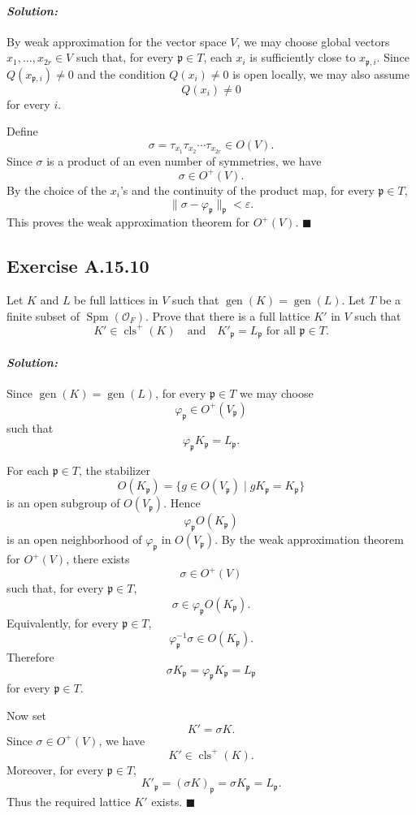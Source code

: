 \documentclass[12pt, a4paper]{article}
\newenvironment{solution}
  {\paragraph{\textit{Solution:}}\par\medskip}
  {\hfill$\blacksquare$\vspace{0.1cm}}
\begin{document}
\begin{solution}
By weak approximation for the vector space \(V\), we may choose global vectors
\(x_1,\dots,x_{2r}\in V\) such that, for every \(\mathfrak p\in T\), each
\(x_i\) is sufficiently close to \(x_{\mathfrak p,i}\). Since \(Q(x_{\mathfrak p,i})\neq 0\)
and the condition \(Q(x_i)\neq 0\) is open locally, we may also assume
\[
Q(x_i)\neq 0
\]
for every \(i\).

Define
\[
\sigma=\tau_{x_1}\tau_{x_2}\cdots\tau_{x_{2r}}\in O(V).
\]
Since \(\sigma\) is a product of an even number of symmetries, we have
\[
\sigma\in O^+(V).
\]
By the choice of the \(x_i\)'s and the continuity of the product map, for every
\(\mathfrak p\in T\),
\[
\|\sigma-\varphi_{\mathfrak p}\|_{\mathfrak p}<\varepsilon .
\]
This proves the weak approximation theorem for \(O^+(V)\).
\end{solution}
\subsection*{Exercise A.15.10}
Let $K$ and $L$ be full lattices in $V$ such that $\operatorname{gen}(K) = \operatorname{gen}(L)$. Let $T$ be a finite subset of $\operatorname{Spm}(\mathcal{O}_F)$. Prove that there is a full lattice $K'$ in $V$ such that
\[ K' \in \operatorname{cls}^+(K) \quad \text{and} \quad K'_{\mathfrak{p}} = L_{\mathfrak{p}} \text{ for all } \mathfrak{p} \in T . \]
\begin{solution}
Since \(\operatorname{gen}(K)=\operatorname{gen}(L)\), for every
\(\mathfrak p\in T\) we may choose
\[
\varphi_{\mathfrak p}\in O^+(V_{\mathfrak p})
\]
such that
\[
\varphi_{\mathfrak p}K_{\mathfrak p}=L_{\mathfrak p}.
\]

For each \(\mathfrak p\in T\), the stabilizer
\[
O(K_{\mathfrak p})
=
\{g\in O(V_{\mathfrak p})\mid gK_{\mathfrak p}=K_{\mathfrak p}\}
\]
is an open subgroup of \(O(V_{\mathfrak p})\). Hence
\[
\varphi_{\mathfrak p}O(K_{\mathfrak p})
\]
is an open neighborhood of \(\varphi_{\mathfrak p}\) in \(O(V_{\mathfrak p})\).
By the weak approximation theorem for \(O^+(V)\), there exists
\[
\sigma\in O^+(V)
\]
such that, for every \(\mathfrak p\in T\),
\[
\sigma\in \varphi_{\mathfrak p}O(K_{\mathfrak p}).
\]
Equivalently, for every \(\mathfrak p\in T\),
\[
\varphi_{\mathfrak p}^{-1}\sigma\in O(K_{\mathfrak p}).
\]
Therefore
\[
\sigma K_{\mathfrak p}
=
\varphi_{\mathfrak p}K_{\mathfrak p}
=
L_{\mathfrak p}
\]
for every \(\mathfrak p\in T\).

Now set
\[
K'=\sigma K.
\]
Since \(\sigma\in O^+(V)\), we have
\[
K'\in \operatorname{cls}^+(K).
\]
Moreover, for every \(\mathfrak p\in T\),
\[
K'_{\mathfrak p}
=
(\sigma K)_{\mathfrak p}
=
\sigma K_{\mathfrak p}
=
L_{\mathfrak p}.
\]
Thus the required lattice \(K'\) exists.
\end{solution}
\end{document}
